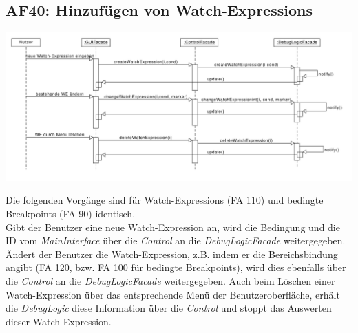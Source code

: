 \documentclass[parskip=full]{scrartcl}
\begin{document}
\subsection{AF40: Hinzufügen von Watch-Expressions}
\begin{center}
\includegraphics[width=1.0\textwidth]{diagrammIdeenUmlet/SequenceDiagrams/seq_WatchExpressionsPDF.pdf}
\end{center}
Die folgenden Vorgänge sind für Watch-Expressions (FA 110) und bedingte Breakpoints (FA 90) identisch. \\
Gibt der Benutzer eine neue Watch-Expression an, wird die Bedingung und die ID vom \textit{MainInterface} über die \textit{Control} an die \textit{DebugLogicFacade} weitergegeben. 
Ändert der Benutzer die Watch-Expression, z.B. indem er die Bereichsbindung angibt (FA  120, bzw. FA 100 für bedingte Breakpoints), wird dies ebenfalls über die \textit{Control} an die \textit{DebugLogicFacade} weitergegeben.
Auch beim Löschen einer Watch-Expression über das entsprechende Menü der Benutzeroberfläche, erhält die \textit{DebugLogic} diese Information über die \textit{Control} und stoppt das Auswerten dieser Watch-Expression.

\newpage
\end{document}
